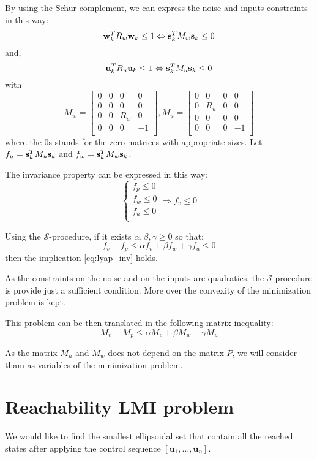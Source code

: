 \documentclass{article}
\theoremstyle{named}
\newcommand{\vect}[1]{\ensuremath{ \mathbf{#1}}}
\newcommand{\Sproc}{$\mathcal{S}$-procedure}
\begin{document}
By using the Schur complement, we can express the noise and inputs constraints in this way:
$$
\wk^T R_w \wk \leq 1
\Leftrightarrow
\sk^T M_w \sk \leq 0
$$
and,
$$
\uk^T R_u \uk \leq 1
\Leftrightarrow
\sk^T M_u \sk \leq 0
$$
with
$$
M_w = \begin{bmatrix}
0&0&0&0\\
0&0&0&0\\
0&0&R_w&0\\
0&0&0&-1\\
\end{bmatrix},
M_u = \begin{bmatrix}
0&0&0&0\\
0&R_u&0&0\\
0&0&0&0\\
0&0&0&-1\\
\end{bmatrix}
$$
where the $0$s stands for the zero matrices with appropriate sizes.
Let $f_u = \sk^T M_u \sk$ and $f_w = \sk^T M_w \sk$.

The invariance property can be expressed in this way:
\begin{equation}\label{eq:lyap_inv}
\left\{
\begin{array}{l}
f_p \leq 0\\
f_w \leq 0\\
f_u \leq 0\\
\end{array}
\right.
\Rightarrow
f_v \leq 0
\end{equation}

Using the \Sproc{}, if it exists $\alpha,\beta,\gamma \geq 0$ so that:
$$
f_v-f_p \leq \alpha f_v + \beta f_w + \gamma f_u \leq 0
$$
then the implication \ref{eq:lyap_inv} holds.

As the constraints on the noise and on the inputs are quadratics, the \Sproc{} is provide just a sufficient condition. More over the convexity of the minimization problem is kept.

This problem can be then translated in the following matrix inequality:
$$
M_v-M_p \leq \alpha M_v + \beta M_w + \gamma M_u
$$

As the matrix $M_u$ and $M_w$ does not depend on the matrix $P$, we will consider tham as variables of the minimization problem.

\section{Reachability LMI problem}
\newcommand{\Vu}{V_{\vect{u}}}
\newcommand{\Vk}{V_{k}}
\newcommand{\Vkn}{V_{k+1}}
We would like to find the smallest ellipsoidal set that contain all the reached states after applying the control sequence $[\vect{u}_1,\dots,\vect{u}_n]$.
\end{document}
